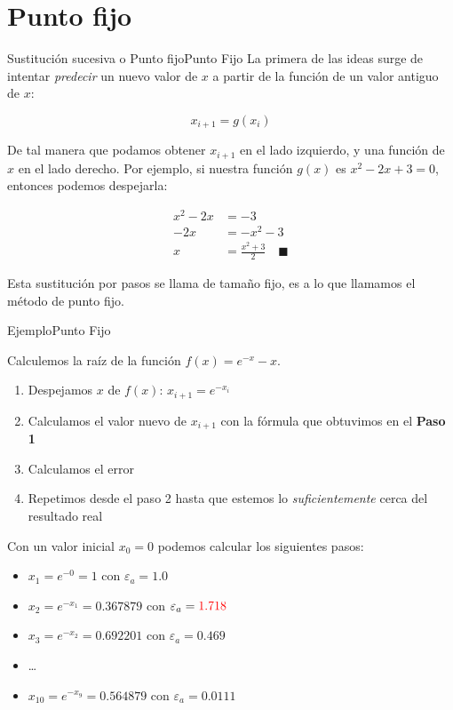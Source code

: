 \documentclass[spanish, c]{beamer}
\begin{document}
\section{Punto fijo}

\begin{frame}{Sustitución sucesiva o Punto fijo}{Punto Fijo}
    La primera de las ideas surge de intentar \textit{predecir} un nuevo valor de $x$ a partir de la función de un valor antiguo de $x$:

    $$x_{i+1} = g(x_i)$$ \pause

    De tal manera que podamos obtener $x_{i+1}$ en el lado izquierdo, y una función de $x$ en el lado derecho. Por ejemplo, si nuestra función $g(x)$ es $x^2 - 2x + 3 = 0$, entonces podemos despejarla:

    \begin{align*}
        x^2 - 2x & = -3 \tag{restamos $3$} \\
        -2 x & = -x^2 - 3 \tag{restamos $x^2$} \\
        x & = \frac{x^2 + 3}{2} \quad \blacksquare \tag{dividimos entre -2}
    \end{align*}

    Esta sustitución por pasos se llama de tamaño fijo, es a lo que llamamos el método de \alert{punto fijo}.
\end{frame}

\begin{frame}{Ejemplo}{Punto Fijo}

    Calculemos la raíz de la función $f(x) = e^{-x} - x$. \pause

    \begin{enumerate}[<+->]
        \item Despejamos $x$ de $f(x)$: $x_{i+1} = e^{-x_i}$
        \item Calculamos el valor nuevo de $x_{i+1}$ con la fórmula que obtuvimos en el \textbf{Paso 1}
        \item Calculamos el error
        \item Repetimos desde el paso 2 hasta que estemos lo \textit{suficientemente} cerca del resultado real
    \end{enumerate} \pause

    Con un valor inicial $x_0 = 0$ podemos calcular los siguientes pasos: \pause
    
    \begin{itemize}[<+->]
        \item $x_1 = e^{-0} = 1$ con $\varepsilon_a = 1.0$
        \item $x_2 = e^{-x_1} = 0.367879$ con $\varepsilon_a = {\color{red} 1.718}$
        \item $x_3 = e^{-x_2} = 0.692201$ con $\varepsilon_a = 0.469$
        \item \dots
        \item $x_{10} = e^{-x_9} = 0.564879$ con $\varepsilon_a = 0.0111$
    \end{itemize}
\end{frame}
\end{document}
